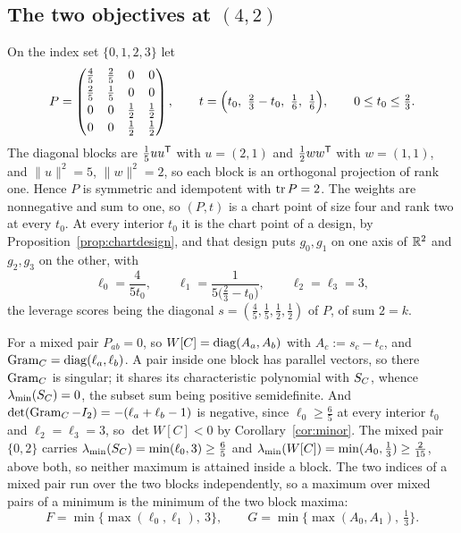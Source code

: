 \subsection{The two objectives at \texorpdfstring{$(4,2)$}{(4,2)}}\label{app:objectives}

\begin{example}\label{ex:objectives}
On the index set $\{0,1,2,3\}$ let
\[
  P=\begin{pmatrix}
     \tfrac45&\tfrac25&0&0\\[2pt]
     \tfrac25&\tfrac15&0&0\\[2pt]
     0&0&\tfrac12&\tfrac12\\[2pt]
     0&0&\tfrac12&\tfrac12\end{pmatrix},
  \qquad
  t=\Bigl(t_0,\ \tfrac23-t_0,\ \tfrac16,\ \tfrac16\Bigr),
  \qquad 0\le t_0\le\tfrac23 .
\]
The diagonal blocks are $\tfrac15uu^{\mathsf{T}}$ with $u=(2,1)$ and
$\tfrac12ww^{\mathsf{T}}$ with $w=(1,1)$, and $\lVert u\rVert^{2}=5$,
$\lVert w\rVert^{2}=2$, so each block is an orthogonal projection of rank
one.  Hence $P$ is symmetric and idempotent with $\operatorname{tr} P=2$.  The weights
are nonnegative and sum to one, so $(P,t)$ is a chart point of size four
and rank two at every $t_0$.  At every interior $t_0$ it is the chart
point of a design, by Proposition~\ref{prop:chartdesign}, and that design
puts $g_0,g_1$ on one axis of $\mathbb{R}^2$ and $g_2,g_3$ on the other, with
\[
  \ell_0=\frac4{5t_0},\qquad
  \ell_1=\frac1{5\bigl(\tfrac23-t_0\bigr)},\qquad
  \ell_2=\ell_3=3 ,
\]
the leverage scores being the diagonal
$s=(\tfrac45,\tfrac15,\tfrac12,\tfrac12)$ of $P$, of sum $2=k$.

For a mixed pair $P_{ab}=0$, so $W[C]=\operatorname{diag}(A_a,A_b)$ with
$A_c:=s_c-t_c$, and $\operatorname{Gram}_C=\operatorname{diag}(\ell_a,\ell_b)$.  A pair inside one
block has parallel vectors, so there $\operatorname{Gram}_C$ is singular; it shares its
characteristic polynomial with $S_{C}$, whence $\lambda_{\min}(S_{C})=0$, the subset
sum being positive semidefinite.  And
$\det(\operatorname{Gram}_C-I_2)=-(\ell_a+\ell_b-1)$ is negative, since
$\ell_0\ge\tfrac65$ at every interior $t_0$ and $\ell_2=\ell_3=3$, so
$\det W[C]<0$ by Corollary~\ref{cor:minor}.  The mixed pair $\{0,2\}$
carries $\lambda_{\min}(S_{C})=\min(\ell_0,3)\ge\tfrac65$ and
$\lambda_{\min}(W[C])=\min(A_0,\tfrac13)\ge\tfrac2{15}$, above both, so neither
maximum is attained inside a block.  The two indices of a mixed pair run
over the two blocks independently, so a maximum over mixed pairs of a
minimum is the minimum of the two block maxima:
\[
  F=\min\bigl\{\max(\ell_0,\ell_1),\ 3\bigr\},
  \qquad
  G=\min\bigl\{\max(A_0,A_1),\ \tfrac13\bigr\} .
\]


\end{example}
